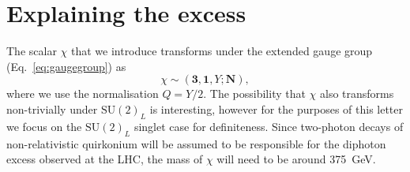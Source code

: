 \section{Explaining the excess}

The scalar $\chi$ that we introduce transforms under the extended gauge group
(Eq.~\ref{eq:gaugegroup}) as
\begin{equation}
  \chi \sim (\mathbf{3}, \mathbf{1}, Y; \mathbf{N}),
\end{equation}
where we use the normalisation $Q=Y/2$. The possibility that $\chi$ also
transforms non-trivially under $\mathrm{SU}(2)_{L}$ is interesting, however for
the purposes of this letter we focus on the $\mathrm{SU}(2)_{L}$ singlet case
for definiteness. Since two-photon decays of non-relativistic quirkonium will be
assumed to be responsible for the diphoton excess observed at the LHC, the mass
of $\chi$ will need to be around \SI{375}{\GeV}.

